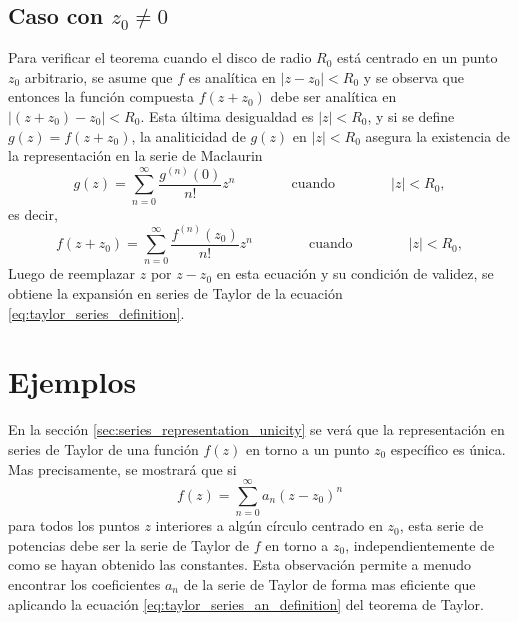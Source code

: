 \documentclass[a4paper]{report}
\begin{document}
\subsection*{Caso con \(z_0\neq0\)}

Para verificar el teorema cuando el disco de radio \(R_0\) está centrado en un punto \(z_0\) arbitrario, se asume que \(f\) es analítica en \(|z-z_0|<R_0\) y se observa que entonces la función compuesta \(f(z+z_0)\) debe ser analítica en \(|(z+z_0)-z_0|<R_0\). Esta última desigualdad es \(|z|<R_0\), y si se define \(g(z)=f(z+z_0)\), la analiticidad de \(g(z)\) en \(|z|<R_0\) asegura la existencia de la representación en la serie de Maclaurin
\[
 g(z)=\sum_{n=0}^\infty\frac{g^{(n)}(0)}{n!}z^n
 \qquad\qquad\textrm{cuando}\qquad\qquad
 |z|<R_0,
\]
es decir, 
\[
 f(z+z_0)=\sum_{n=0}^\infty\frac{f^{(n)}(z_0)}{n!}z^n
 \qquad\qquad\textrm{cuando}\qquad\qquad
 |z|<R_0, 
\]
Luego de reemplazar \(z\) por \(z-z_0\) en esta ecuación y su condición de validez, se obtiene la expansión en series de Taylor de la ecuación \ref{eq:taylor_series_definition}. 

\section{Ejemplos}\label{sec:taylor_series_examples}

En la sección \ref{sec:series_representation_unicity} se verá que la representación en series de Taylor de una función \(f(z)\) en torno a un punto  \(z_0\) específico es única. Mas precisamente, se mostrará que si
\[
 f(z)=\sum_{n=0}^\infty a_n(z-z_0)^n
\]
para todos los puntos \(z\) interiores a algún círculo centrado en \(z_0\), esta serie de potencias debe ser la serie de Taylor de \(f\) en torno a \(z_0\), independientemente de como se hayan obtenido las constantes. Esta observación permite a menudo encontrar los coeficientes \(a_n\) de la serie de Taylor de forma mas eficiente que aplicando la ecuación \ref{eq:taylor_series_an_definition} del teorema de Taylor.
\end{document}
